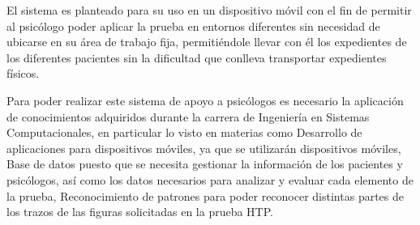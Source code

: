 El sistema es planteado para su uso en un dispositivo móvil con el fin de permitir al psicólogo poder aplicar la prueba en entornos diferentes sin necesidad de ubicarse en su área de trabajo fija, permitiéndole llevar con él los expedientes de los diferentes pacientes sin la dificultad que conlleva transportar expedientes físicos.

Para poder realizar este sistema de apoyo a psicólogos es necesario la aplicación de conocimientos adquiridos durante la carrera de Ingeniería en Sistemas Computacionales, en particular lo visto en materias como Desarrollo de aplicaciones para dispositivos móviles, ya que se utilizarán dispositivos móviles, Base de datos puesto que se necesita gestionar la información de los pacientes y psicólogos, así como los datos necesarios para analizar y evaluar cada elemento de la prueba, Reconocimiento de patrones para poder reconocer distintas partes de los trazos de las figuras solicitadas en la prueba HTP.